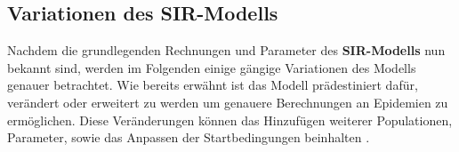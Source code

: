 \documentclass[12pt]{scrartcl} %
\begin{document}









\subsection{Variationen des SIR-Modells}

Nachdem die grundlegenden Rechnungen und Parameter des \textbf{SIR-Modells} nun bekannt sind, werden im Folgenden einige gängige Variationen des Modells genauer betrachtet. Wie bereits erwähnt ist das Modell prädestiniert dafür, verändert oder erweitert zu werden um genauere Berechnungen an Epidemien zu ermöglichen. Diese Veränderungen können das Hinzufügen weiterer Populationen, Parameter, sowie das Anpassen der Startbedingungen beinhalten \cite{5}.

\end{document}
